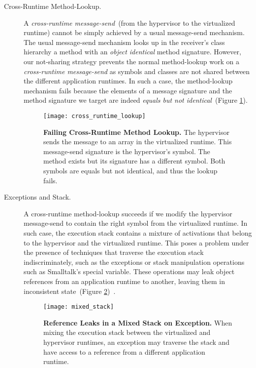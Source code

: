 \begin{description}

\item[Cross-Runtime Method-Lookup.]A \emph{cross-runtime message-send}~(from the hypervisor to the virtualized runtime) cannot be simply achieved by a usual message-send mechanism. The usual message-send mechanism looks up in the receiver's class hierarchy a method with an \emph{object identical} method signature. However, our not-sharing strategy prevents the normal method-lookup work on a \emph{cross-runtime message-send} as symbols and classes are not shared between the different application runtimes. In such a case, the method-lookup mechanism fails because the elements of a message signature and the method signature we target are indeed \emph{equals but not identical}~(Figure \ref{fig:cross_runtime_lookup}).

\begin{figure}[ht]
\center
\texttt{[image: cross\_runtime\_lookup]}
\caption{\textbf{Failing Cross-Runtime Method Lookup.} The hypervisor sends the  message to an array in the virtualized runtime. This message-send signature is the hypervisor's  symbol. The  method exists but its signature has a different  symbol. Both symbols are equals but not identical, and thus the lookup fails.\label{fig:cross_runtime_lookup}}
\end{figure}

\item[Exceptions and Stack.] A cross-runtime method-lookup succeeds if we modify the hypervisor message-send to contain the right symbol from the virtualized runtime. In such case, the execution stack contains a mixture of activations that belong to the hypervisor and the virtualized runtime. This poses a problem under the presence of techniques that traverse the execution stack indiscriminately, such as the exceptions or stack manipulation operations such as Smalltalk's  special variable. These operations may leak object references from an application runtime to another, leaving them in inconsistent state~(Figure \ref{fig:mixed_stack})~\cite{Mett10a}.

\begin{figure}[ht]
\center
\texttt{[image: mixed\_stack]}
\caption{\textbf{Reference Leaks in a Mixed Stack on Exception.} When mixing the execution stack between the virtualized and hypervisor runtimes, an exception may traverse the stack and have access to a reference from a different application runtime.\label{fig:mixed_stack}}
\end{figure}

\end{description}

